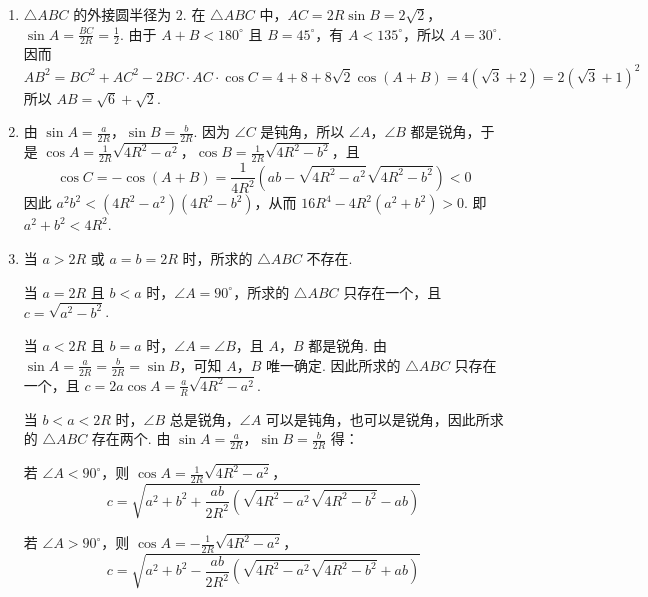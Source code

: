 \begin{solution}
\begin{enumerate}
\item \(\triangle ABC\) 的外接圆半径为 \(2\). 在 \(\triangle ABC\) 中，\(AC=2R\sin B=2\sqrt{2}\)，\(\sin A=\frac{BC}{2R}=\frac{1}{2}\). 由于 \(A+B<180^\circ\) 且 \(B=45^\circ\)，有 \(A<135^\circ\)，所以 \(A=30^\circ\). 因而
\[
AB^2=BC^2+AC^2-2BC\cdot AC\cdot\cos C
=4+8+8\sqrt{2}\cos(A+B)=4(\sqrt{3}+2)=2(\sqrt{3}+1)^2
\]
所以 \(AB=\sqrt{6}+\sqrt{2}\).

\item 由 \(\sin A=\frac{a}{2R}\)，\(\sin B=\frac{b}{2R}\). 因为 \(\angle C\) 是钝角，所以 \(\angle A\)，\(\angle B\) 都是锐角，于是
\(\cos A=\frac{1}{2R}\sqrt{4R^2-a^2}\)，\(\cos B=\frac{1}{2R}\sqrt{4R^2-b^2}\)，且
\[
\cos C=-\cos(A+B)=\frac{1}{4R^2}\left(ab-\sqrt{4R^2-a^2}\sqrt{4R^2-b^2}\right)<0
\]
因此 \(a^2b^2<(4R^2-a^2)(4R^2-b^2)\)，从而 \(16R^4-4R^2(a^2+b^2)>0\). 即 \(a^2+b^2<4R^2\).

\item 当 \(a>2R\) 或 \(a=b=2R\) 时，所求的 \(\triangle ABC\) 不存在.

当 \(a=2R\) 且 \(b<a\) 时，\(\angle A=90^\circ\)，所求的 \(\triangle ABC\) 只存在一个，且 \(c=\sqrt{a^2-b^2}\).

当 \(a<2R\) 且 \(b=a\) 时，\(\angle A=\angle B\)，且 \(A\)，\(B\) 都是锐角. 由 \(\sin A=\frac{a}{2R}=\frac{b}{2R}=\sin B\)，可知 \(A\)，\(B\) 唯一确定. 因此所求的 \(\triangle ABC\) 只存在一个，且
\(c=2a\cos A=\frac{a}{R}\sqrt{4R^2-a^2}\).

当 \(b<a<2R\) 时，\(\angle B\) 总是锐角，\(\angle A\) 可以是钝角，也可以是锐角，因此所求的 \(\triangle ABC\) 存在两个. 由 \(\sin A=\frac{a}{2R}\)，\(\sin B=\frac{b}{2R}\) 得：

若 \(\angle A<90^\circ\)，则 \(\cos A=\frac{1}{2R}\sqrt{4R^2-a^2}\)，
\[
c=\sqrt{a^2+b^2+\frac{ab}{2R^2}\left(\sqrt{4R^2-a^2}\sqrt{4R^2-b^2}-ab\right)}
\]

若 \(\angle A>90^\circ\)，则 \(\cos A=-\frac{1}{2R}\sqrt{4R^2-a^2}\)，
\[
c=\sqrt{a^2+b^2-\frac{ab}{2R^2}\left(\sqrt{4R^2-a^2}\sqrt{4R^2-b^2}+ab\right)}
\]
\end{enumerate}
\end{solution}

